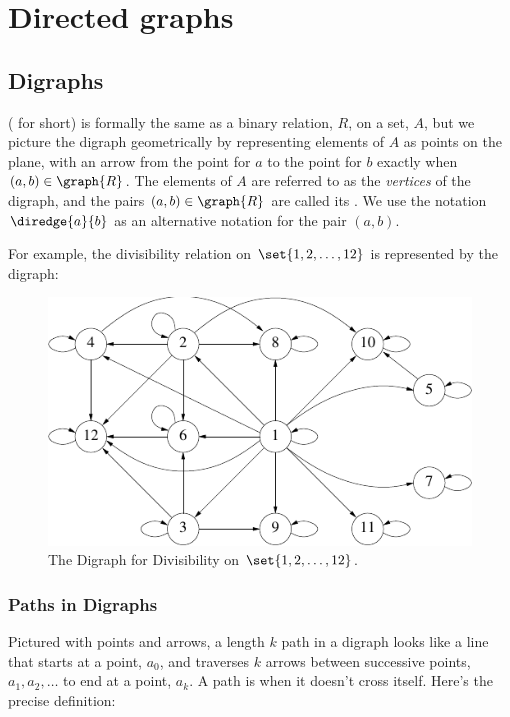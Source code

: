\chapter{Directed graphs}\label{digraphs_chap}

\section{Digraphs}\label{digraphs_sec}

 ( for
short) is formally the same as a binary relation, $R$, on a set, $A$, but
we picture the digraph geometrically by representing elements of $A$ as
points on the plane, with an arrow from the point for $a$ to the point for
$b$ exactly when $(a,b) \in \graph{R}$.  The elements of $A$ are referred
to as the \emph{vertices} of the digraph, and the pairs $(a,b) \in
\graph{R}$ are called its .  We use the notation
$\diredge{a}{b}$ as an alternative notation for the pair $(a,b)$.

For example, the divisibility relation on $\set{1,2,\dots,12}$ is
represented by the digraph:
\begin{figure}[h]
\centering \includegraphics{figures/divisibility.pdf}
\caption{The Digraph for Divisibility on $\set{1,2,\dots,12}$.}
\label{fig:divisibility-digraph}
\end{figure}


\subsection{Paths in Digraphs}\label{paths}

Pictured with points and arrows, a length $k$ path in a digraph looks
like a line that starts at a point, $a_0$, and traverses $k$ arrows
between successive points, $a_1,a_2,\dots$ to end at a point, $a_k$.
A path is  when it doesn't cross itself.  Here's the
precise definition:


